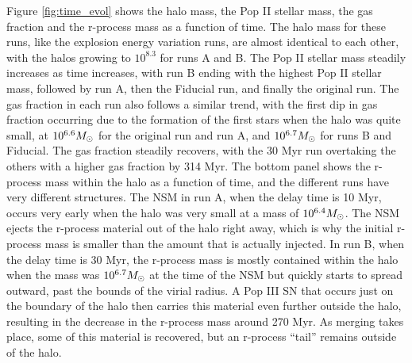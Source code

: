 \documentclass[fleqn,usenatbib]{mnras}
\begin{document}
Figure \ref{fig:time_evol} shows the halo mass, the Pop II stellar mass, the gas fraction and the r-process mass as a function of time. The halo mass for these runs, like the explosion energy variation runs, are almost identical to each other, with the halos growing to $10^{8.3}$ \Ms{} for runs A and B. The Pop II stellar mass steadily increases as time increases, with run B ending with the highest Pop II stellar mass, followed by run A, then the Fiducial run, and finally the original run. The gas fraction in each run also follows a similar trend, with the first dip in gas fraction occurring due to the formation of the first stars when the halo was quite small, at $10^{6.6} \Ms$ for the original run and run A, and $10^{6.7} \Ms$ for runs B and Fiducial. The gas fraction steadily recovers, with the 30 Myr run overtaking the others with a higher gas fraction by 314 Myr. The bottom panel shows the r-process mass within the halo as a function of time, and the different runs have very different structures. The NSM in run A, when the delay time is 10 Myr, occurs very early when the halo was very small at a mass of $10^{6.4} \Ms$. The NSM ejects the r-process material out of the halo right away, which is why the initial r-process mass is smaller than the amount that is actually injected. In run B, when the delay time is 30 Myr, the r-process mass is mostly contained within the halo when the mass was $10^{6.7} \Ms$ at the time of the NSM but quickly starts to spread outward, past the bounds of the virial radius. A Pop III SN that occurs just on the boundary of the halo then carries this material even further outside the halo, resulting in the decrease in the r-process mass around 270 Myr. As merging takes place, some of this material is recovered, but an r-process ``tail'' remains outside of the halo. 
\end{document}
